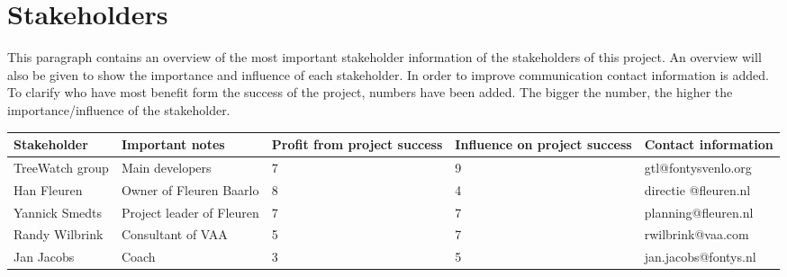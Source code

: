 \section{Stakeholders}

This paragraph contains an overview of the most important stakeholder information of the stakeholders of this project. An overview will also be given to show the importance and influence of each stakeholder. In order to improve communication contact information is added. To clarify who have most benefit form the success of the project, numbers have been added. The bigger the number, the higher the importance/influence of the stakeholder.

\begin{tabular}{| p{} | p{3cm} | p{} | p{} | p{} |}
	\hline
	Stakeholder & Important notes & Profit from project success & Influence on project success & Contact information \\
	\hline
	TreeWatch group & Main developers & 7 & 9 & gtl@fontysvenlo.org \\
	\hline
	Han Fleuren & Owner of Fleuren Baarlo & 8 & 4 & directie @fleuren.nl \\
	\hline
	Yannick Smedts & Project leader of Fleuren & 7 & 7 & planning@fleuren.nl \\
	\hline
	Randy Wilbrink & Consultant of VAA & 5 & 7 & rwilbrink@vaa.com \\
	\hline
	Jan Jacobs & Coach & 3 & 5 & jan.jacobs@fontys.nl \\
	\hline
\end{tabular}